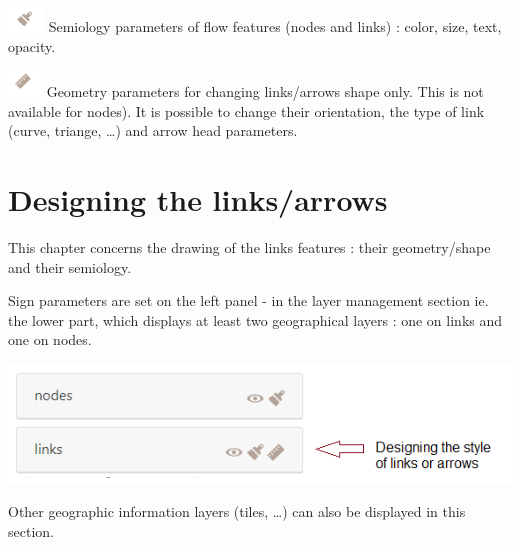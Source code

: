 \documentclass[
  letterpaper,
  DIV=11,
  numbers=noendperiod]{scrreprt}
\begin{document}
\includegraphics{images/Buton_action_semio.png} Semiology parameters of
flow features (nodes and links) : color, size, text, opacity.

\includegraphics{images/Buton_action_geom.png} Geometry parameters for
changing links/arrows shape only. This is not available for nodes). It
is possible to change their orientation, the type of link (curve,
triange, \ldots) and arrow head parameters.


\chapter{Designing the links/arrows}\label{designing-the-linksarrows}

This chapter concerns the drawing of the links features : their
geometry/shape and their semiology.

Sign parameters are set on the left panel - in the layer management
section ie. the lower part, which displays at least two geographical
layers : one on links and one on nodes.

\includegraphics{images/geom_panel_flowsigns.png}

\begin{tcolorbox}[enhanced jigsaw, coltitle=black, opacitybacktitle=0.6, title=\textcolor{quarto-callout-note-color}{\faInfo}\hspace{0.5em}{Note:}, bottomtitle=1mm, colframe=quarto-callout-note-color-frame, leftrule=.75mm, arc=.35mm, left=2mm, colbacktitle=quarto-callout-note-color!10!white, toptitle=1mm, bottomrule=.15mm, colback=white, breakable, opacityback=0, rightrule=.15mm, toprule=.15mm, titlerule=0mm]

Other geographic information layers (tiles, \ldots) can also be
displayed in this section.

\end{tcolorbox}
\end{document}
